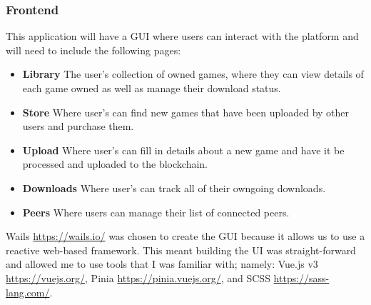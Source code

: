 \subsubsection*{Frontend}

This application will have a GUI where users can interact with the platform and will need to include the following pages:

\begin{itemize}
  \item \textbf{Library} The user's collection of owned games, where they can view details of each game owned as well as manage their download status.
  \item \textbf{Store} Where user's can find new games that have been uploaded by other users and purchase them.
  \item \textbf{Upload} Where user's can fill in details about a new game and have it be processed and uploaded to the blockchain.
  \item \textbf{Downloads} Where user's can track all of their owngoing downloads.
  \item \textbf{Peers} Where users can manage their list of connected peers.
\end{itemize}

\vspace{2mm}\noindent
Wails \url{https://wails.io/} was chosen to create the GUI because it allows us to use a reactive web-based framework. This meant building the UI was straight-forward and allowed me to use tools that I was familiar with; namely: Vue.js v3 \url{https://vuejs.org/}, Pinia \url{https://pinia.vuejs.org/}, and SCSS \url{https://sass-lang.com/}.